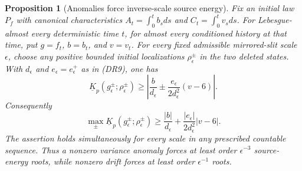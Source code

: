 \documentclass[11pt]{article}
\newtheorem{proposition}[theorem]{Proposition}
\theoremstyle{definition}\newtheorem{definition}[theorem]{Definition}
\theoremstyle{remark}\newtheorem{remark}[theorem]{Remark}
\begin{document}
\begin{proposition}[Anomalies force inverse-scale source energy]
\label{prop:visited-state-energy-necessity}
Fix an initial law $P_f$ with canonical characteristics
$A_t=\int_0^t b_sds$ and $C_t=\int_0^t v_sds$.
For Lebesgue-almost every deterministic time $t$, for almost every
conditioned history at that time, put $g=f_t$, $b=b_t$, and $v=v_t$.
For every fixed admissible mirrored-slit scale $\epsilon$, choose any
positive bounded initial localizations $\rho_\epsilon^\pm$ in the two
deleted states. With $d_\epsilon$ and $e_\epsilon=e_\epsilon^+$ as
in (DR9), one has
\[
 \underline K_p(g_\epsilon^\pm;\rho_\epsilon^\pm)
 \ge\left|\frac b{d_\epsilon}
       \mathbin{\pm}\frac{e_\epsilon}{2d_\epsilon^2}(v-6)\right|.
 \tag{VN2}
\]
Consequently
\[
 \max_{\pm}\underline K_p(g_\epsilon^\pm;\rho_\epsilon^\pm)
 \ge \frac{|b|}{d_\epsilon}
       +\frac{|e_\epsilon|}{2d_\epsilon^2}|v-6|.
 \tag{VN3}
\]
The assertion holds simultaneously for every scale in any prescribed
countable sequence. Thus a nonzero variance anomaly forces at least
order $\epsilon^{-3}$ source-energy roots, while nonzero drift forces
at least order $\epsilon^{-1}$ roots.
\end{proposition}
\end{document}
